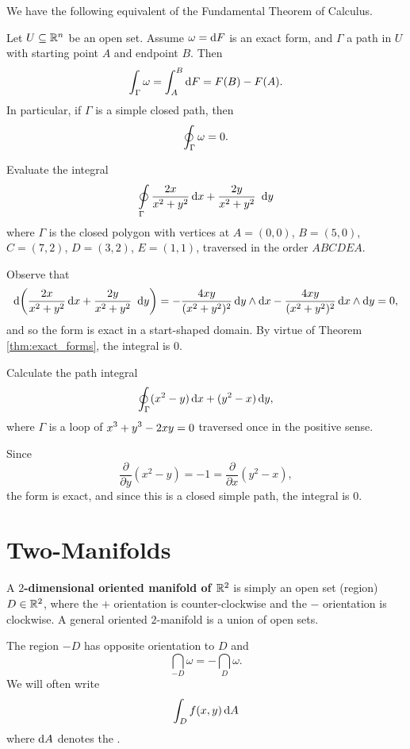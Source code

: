  We have the following equivalent of the Fundamental
Theorem of Calculus.
\begin{thm}\label{thm:exact_forms}
Let $U \subseteq \mathbb{R}^n$ be an open set. Assume $\omega = \d F$ is an exact form, and $\Gamma$ a path in $U$ with starting
point $A$ and endpoint $B$. Then
$$\dint _{\Gamma} \omega = \dint _{A} ^B \d F = F(B) - F(A).
$$In particular, if $\Gamma $ is a simple closed path, then
$$\displaystyle\oint _{\Gamma} \omega = 0.$$
\end{thm}
\begin{exa}
Evaluate the integral $$\doint\limits_\Gamma \dfrac{2x}{x^2 +
y^2}\d{x} + \dfrac{2y}{x^2 + y^2}\ \d{y}
$$ where $\Gamma$ is the closed polygon with vertices at $A=(0,0)$, $B=(5,0)$, $C=(7,2)$, $D= (3,2)$, $E=(1,1)$, traversed in the order
$ABCDEA$.
\end{exa}
\begin{solu}Observe that $$ \d{\left(\dfrac{2x}{x^2 + y^2}\d{x} +
\dfrac{2y}{x^2 + y^2}\ \d{y}\right)}   = -\dfrac{4xy}{(x^2 +
y^2)^2}\d{y} \wedge \d{x}  -\dfrac{4xy}{(x^2 + y^2)^2}\d{x} \wedge
\d{y} =0,
$$and so the form is exact in a start-shaped domain. By virtue of Theorem
\ref{thm:exact_forms}, the integral is $0$.
\end{solu}
\begin{exa}
Calculate the path integral $$\doint _{\Gamma} (x^2 - y)\d{x}+ (y^2 -
x)\d{y},$$ where $\Gamma$ is a loop of  $\displaystyle{ x^3 + y^3 - 2xy = 0}$
traversed once in the positive sense.
\end{exa}\begin{solu} Since
$$\dfrac{\partial}{\partial y} (x^2 - y) = -1 =
\dfrac{\partial}{\partial x} (y^2 - x), $$the form is exact, and
since this is a closed simple path, the integral is $0$.
\end{solu}







\section{Two-Manifolds}
\begin{df}
A  \textbf{$2$-dimensional  oriented manifold of $\mathbb{R}^2$} is simply
an open set  (region) $D\in \mathbb{R}^2$, where the $+$ orientation is
counter-clockwise and the $-$  orientation is clockwise. A general
oriented $2$-manifold is a union of open sets.
\end{df}
\begin{rem}The region $-D$ has opposite orientation to $D$ and
$$ \dint _{-D} \omega = -\dint _D \omega .   $$ We will often write
$$\dint _Df(x,y)\d{A} $$ where $\d{A}$ denotes the .
\end{rem}

